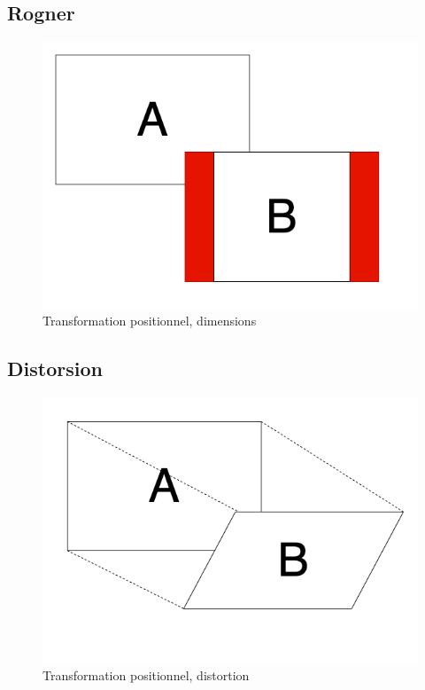 \documentclass[
  french,
]{book}
\begin{document}
\hypertarget{rogner}{%
\subsection{Rogner}\label{rogner}}

\begin{figure}
\centering
\includegraphics{medias/traiter/figures/dia_transfogeo_rogner.png}
\caption{Transformation positionnel, dimensions}
\end{figure}

\hypertarget{distorsion}{%
\subsection{Distorsion}\label{distorsion}}

\begin{figure}
\centering
\includegraphics{medias/traiter/figures/dia_transfogeo_distortion.png}
\caption{Transformation positionnel, distortion}
\end{figure}
\end{document}
